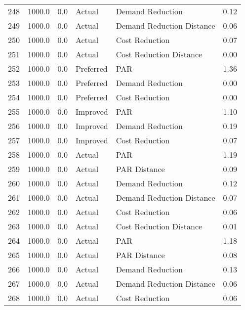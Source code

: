 \begin{longtable}{lrrllr}
248  &       1000.0 &     0.0 &         Actual &           Demand Reduction &   0.12 \\
249  &       1000.0 &     0.0 &         Actual &  Demand Reduction Distance &   0.06 \\
250  &       1000.0 &     0.0 &         Actual &             Cost Reduction &   0.07 \\
251  &       1000.0 &     0.0 &         Actual &    Cost Reduction Distance &   0.00 \\
252  &       1000.0 &     0.0 &      Preferred &                        PAR &   1.36 \\
253  &       1000.0 &     0.0 &      Preferred &           Demand Reduction &   0.00 \\
254  &       1000.0 &     0.0 &      Preferred &             Cost Reduction &   0.00 \\
255  &       1000.0 &     0.0 &       Improved &                        PAR &   1.10 \\
256  &       1000.0 &     0.0 &       Improved &           Demand Reduction &   0.19 \\
257  &       1000.0 &     0.0 &       Improved &             Cost Reduction &   0.07 \\
258  &       1000.0 &     0.0 &         Actual &                        PAR &   1.19 \\
259  &       1000.0 &     0.0 &         Actual &               PAR Distance &   0.09 \\
260  &       1000.0 &     0.0 &         Actual &           Demand Reduction &   0.12 \\
261  &       1000.0 &     0.0 &         Actual &  Demand Reduction Distance &   0.07 \\
262  &       1000.0 &     0.0 &         Actual &             Cost Reduction &   0.06 \\
263  &       1000.0 &     0.0 &         Actual &    Cost Reduction Distance &   0.01 \\
264  &       1000.0 &     0.0 &         Actual &                        PAR &   1.18 \\
265  &       1000.0 &     0.0 &         Actual &               PAR Distance &   0.08 \\
266  &       1000.0 &     0.0 &         Actual &           Demand Reduction &   0.13 \\
267  &       1000.0 &     0.0 &         Actual &  Demand Reduction Distance &   0.06 \\
268  &       1000.0 &     0.0 &         Actual &             Cost Reduction &   0.06 \\

\end{longtable}

